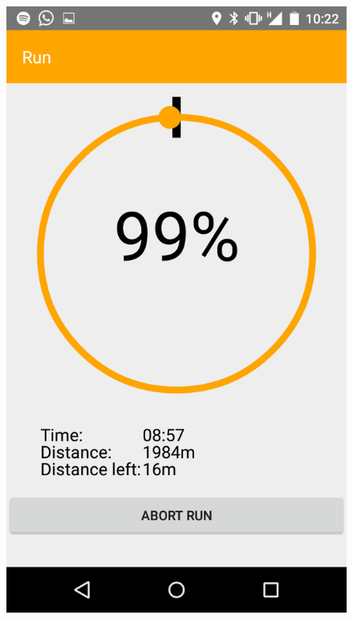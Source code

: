 \begin{figure}
\centering
\begin{minipage}{.4\textwidth}
  \centering
  \includegraphics[width=.8\linewidth]{abb/bsp/bsp13}
  \label{fig:bsp13}
\end{minipage}
\begin{minipage}{.4\textwidth}
  \centering

\end{minipage}
\end{figure}

